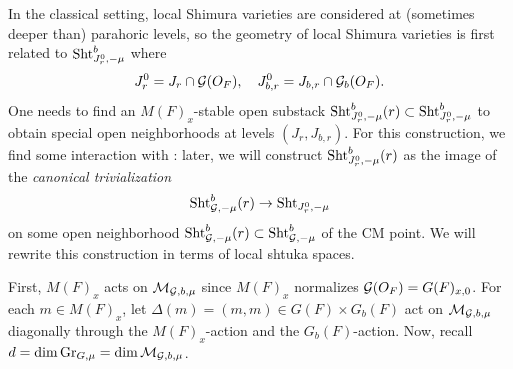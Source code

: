 \documentclass[12pt,reqno]{amsart}
\begin{document}
In the classical setting, local Shimura varieties are considered at (sometimes deeper than) parahoric levels, so the geometry of local Shimura varieties is first related to ${\operatorname{Sht}}_{J_r^0, -\mu}^b$ where 
\[
    J_r^0 = J_r \cap {\mathcal{G}}(O_F) , \quad 
    J_{b, r}^0 = J_{b, r} \cap {\mathcal{G}}_b(O_F). 
\]
One needs to find an $M(F)_x$-stable open substack ${\operatorname{Sht}}_{J_r^0, -\mu}^b(r) \subset {\operatorname{Sht}}_{J_r^0, -\mu}^b$ to obtain special open neighborhoods at levels $(J_r, J_{b, r})$. For this construction, we find some interaction with : later, we will construct ${\operatorname{Sht}}_{J_r^0, -\mu}^b(r)$ as the image of the \textit{canonical trivialization}
\[
    {\operatorname{Sht}}_{{\mathcal{G}}, -\mu}^b(r) \to {\operatorname{Sht}}_{J_r^0, -\mu}
\]
on some open neighborhood ${\operatorname{Sht}}_{{\mathcal{G}}, -\mu}^b(r) \subset {\operatorname{Sht}}_{{\mathcal{G}}, -\mu}^b$ of the CM point. We will rewrite this construction in terms of local shtuka spaces. %

First, $M(F)_x$ acts on ${\mathcal{M}}_{{\mathcal{G}}, b, \mu}$ since $M(F)_x$ normalizes ${\mathcal{G}}(O_F) = G(F)_{x, 0}$. For each $m \in M(F)_x$, let $\Delta(m) = (m , m) \in G(F) \times G_b(F)$ act on ${\mathcal{M}}_{{\mathcal{G}}, b, \mu}$ diagonally through the $M(F)_x$-action and the $G_b(F)$-action. Now, recall $d = \dim {\operatorname{Gr}}_{G, \mu} = \dim {\mathcal{M}}_{{\mathcal{G}}, b, \mu}$. 
\end{document}

